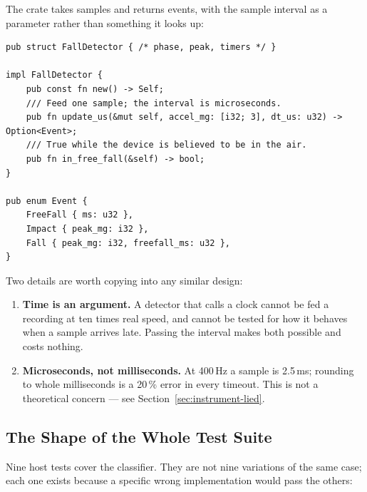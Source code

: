 The crate takes samples and returns events, with the sample interval as a parameter rather
than something it looks up:

\begin{verbatim}
pub struct FallDetector { /* phase, peak, timers */ }

impl FallDetector {
    pub const fn new() -> Self;
    /// Feed one sample; the interval is microseconds.
    pub fn update_us(&mut self, accel_mg: [i32; 3], dt_us: u32) -> Option<Event>;
    /// True while the device is believed to be in the air.
    pub fn in_free_fall(&self) -> bool;
}

pub enum Event {
    FreeFall { ms: u32 },
    Impact { peak_mg: i32 },
    Fall { peak_mg: i32, freefall_ms: u32 },
}
\end{verbatim}

Two details are worth copying into any similar design:

\begin{enumerate}
    \item \textbf{Time is an argument.} A detector that calls a clock cannot be fed a
          recording at ten times real speed, and cannot be tested for how it behaves when a
          sample arrives late. Passing the interval makes both possible and costs nothing.
    \item \textbf{Microseconds, not milliseconds.} At 400\,Hz a sample is 2.5\,ms; rounding to
          whole milliseconds is a 20\,\% error in every timeout. This is not a theoretical
          concern — see Section~\ref{sec:instrument-lied}.
\end{enumerate}

\subsection{The Shape of the Whole Test Suite}

Nine host tests cover the classifier. They are not nine variations of the same case; each one
exists because a specific wrong implementation would pass the others:

